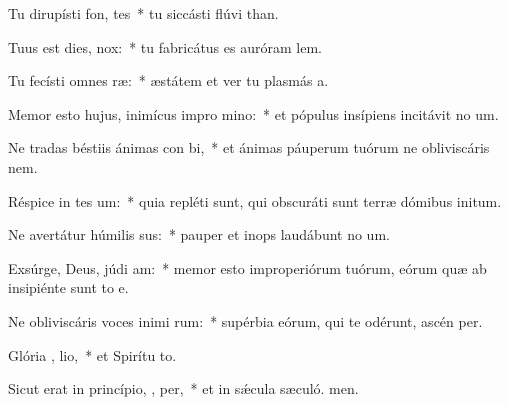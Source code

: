 \item Tu dirupísti fon,  tes~* tu siccásti flúvi than.
\item Tuus est dies,    nox:~* tu fabricátus es auróram  lem.
\item Tu fecísti omnes  ræ:~* æstátem et ver tu plasmás a.
\item Memor esto hujus, inimícus impro mino:~* et pópulus insípiens incitávit no um.
\item Ne tradas béstiis ánimas con bi,~* et ánimas páuperum tuórum ne obliviscáris  nem.
\item Réspice in tes um:~* quia repléti sunt, qui obscuráti sunt terræ dómibus initum.
\item Ne avertátur húmilis  sus:~* pauper et inops laudábunt no um.
\item Exsúrge, Deus, júdi  am:~* memor esto improperiórum tuórum, eórum quæ ab insipiénte sunt to e.
\item Ne obliviscáris voces inimi rum:~* supérbia eórum, qui te odérunt, ascén per.
\item Glória ,  lio,~* et Spirítu to.
\item Sicut erat in princípio,  ,  per,~* et in sǽcula sæculó. men.
